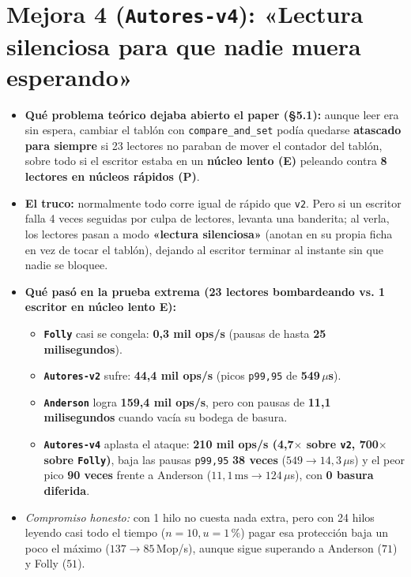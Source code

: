 \documentclass[11pt,a4paper]{article}
\begin{document}
\section*{Mejora 4 (\texttt{Autores-v4}): «Lectura silenciosa para que nadie muera esperando»}
\begin{itemize}
  \item \textbf{Qué problema teórico dejaba abierto el paper (\S 5.1):} aunque leer era sin espera, cambiar el tablón con \texttt{compare\_and\_set} podía quedarse \textbf{atascado para siempre} si 23 lectores no paraban de mover el contador del tablón, sobre todo si el escritor estaba en un \textbf{núcleo lento (E)} peleando contra \textbf{8 lectores en núcleos rápidos (P)}.
  \item \textbf{El truco:} normalmente todo corre igual de rápido que \texttt{v2}. Pero si un escritor falla 4 veces seguidas por culpa de lectores, levanta una banderita; al verla, los lectores pasan a modo \textbf{«lectura silenciosa»} (anotan en su propia ficha en vez de tocar el tablón), dejando al escritor terminar al instante sin que nadie se bloquee.
  \item \textbf{Qué pasó en la prueba extrema (23 lectores bombardeando vs. 1 escritor en núcleo lento E):}
  \begin{itemize}
    \item \textbf{\texttt{Folly}} casi se congela: \textbf{0{,}3 mil ops/s} (pausas de hasta \textbf{25 milisegundos}).
    \item \textbf{\texttt{Autores-v2}} sufre: \textbf{44{,}4 mil ops/s} (picos \texttt{p99,95} de \textbf{549\,$\mu$s}).
    \item \textbf{\texttt{Anderson}} logra \textbf{159{,}4 mil ops/s}, pero con pausas de \textbf{11{,}1 milisegundos} cuando vacía su bodega de basura.
    \item \textbf{\texttt{Autores-v4}} aplasta el ataque: \textbf{210 mil ops/s (4{,}7$\times$ sobre \texttt{v2}, 700$\times$ sobre \texttt{Folly})}, baja las pausas \texttt{p99,95} \textbf{38 veces} ($549 \to 14{,}3\,\mu$s) y el peor pico \textbf{90 veces} frente a Anderson ($11{,}1\,\text{ms} \to 124\,\mu$s), con \textbf{0 basura diferida}.
  \end{itemize}
  \item \emph{Compromiso honesto:} con 1 hilo no cuesta nada extra, pero con 24 hilos leyendo casi todo el tiempo ($n = 10, u = 1\,\%$) pagar esa protección baja un poco el máximo ($137 \to 85$\,Mop/s), aunque sigue superando a Anderson ($71$) y Folly ($51$).
\end{itemize}
\end{document}

